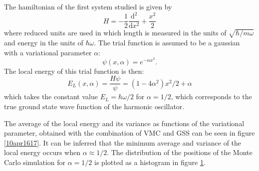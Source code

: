\documentclass[twocolumn]{article}
\begin{document}
\begin{large}
\begin{figure}[!t]
    \label{11apr0918}
\end{figure}
The hamiltonian of the first system studied is given by
\begin{equation}
    H = -\frac{1}{2}\frac{\text{d}^2}{\text{d}x^2} + \frac{x^2}{2}
\end{equation}
where reduced units are used in which length is measured in the units of $\sqrt{\hbar/m\omega}$ and energy in the units of $\hbar\omega$. The trial function is assumed to be a gaussian with a variational parameter $\alpha$:
\begin{equation}
    \psi(x,\alpha) = e^{-\alpha x^2}.
\end{equation}
The local energy of this trial function is then:
\begin{equation}
    E_L(x,\alpha) =\frac{H\psi}{\psi} = \left(1-4\alpha^2\right)x^2/2 + \alpha
\end{equation}
which takes the constant value $E_L=\hbar\omega/2$ for $\alpha = 1/2$, which corresponds to the true ground state wave function of the harmonic oscillator. 

The average of the local energy and its variance as functions of the variational parameter, obtained with the combination of VMC and GSS can be seen in figure \ref{10apr1617}. It can be inferred that the minimum average and variance of the local energy occurs when $\alpha\approx 1/2$. The distribution of the positions of the Monte Carlo simulation for $\alpha=1/2$ is plotted as a histogram in figure \ref{11apr0918}.

\end{large}
\end{document}
